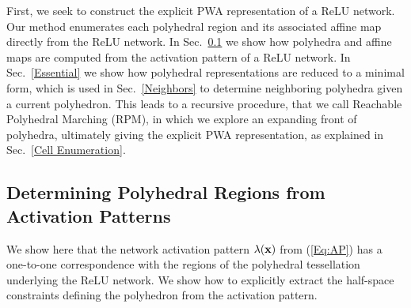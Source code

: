 First, we seek to construct the explicit PWA representation of a ReLU network. Our method enumerates each polyhedral region and its associated affine map directly from the ReLU network. In Sec.~\ref{Cells} we show how polyhedra and affine maps are computed from the activation pattern of a ReLU network. In Sec.~\ref{Essential} we show how polyhedral representations are reduced to a minimal form, which is used in Sec.~\ref{Neighbors} to determine neighboring polyhedra given a current polyhedron. This leads to a recursive procedure, that we call Reachable Polyhedral Marching (RPM), in which we explore an expanding front of polyhedra, ultimately giving the explicit PWA representation, as explained in Sec.~\ref{Cell Enumeration}.

\subsection{Determining Polyhedral Regions from Activation Patterns} 
\label{Cells}

We show here that the network activation pattern $\mathbf{\lambda}(\mathbf{x})$ from (\ref{Eq:AP}) has a one-to-one correspondence with the regions of the polyhedral tessellation underlying the ReLU network. We show how to explicitly extract the half-space constraints defining the polyhedron from the activation pattern. 

